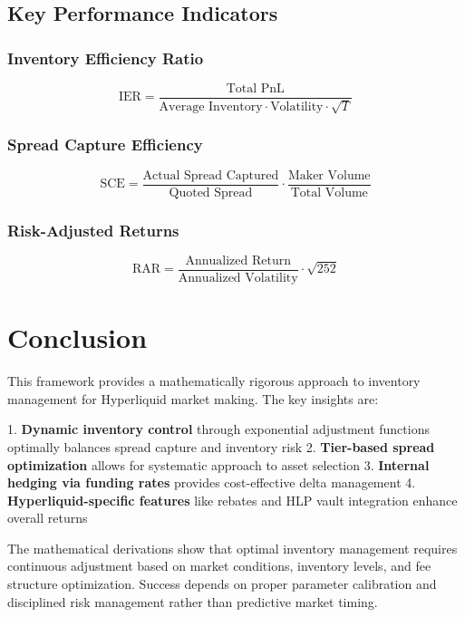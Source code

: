 \documentclass[11pt,a4paper]{article}
\theoremstyle{definition}
\begin{document}
\subsection{Key Performance Indicators}

\subsubsection{Inventory Efficiency Ratio}
\begin{equation}
\text{IER} = \frac{\text{Total PnL}}{\text{Average Inventory} \cdot \text{Volatility} \cdot \sqrt{T}}
\end{equation}

\subsubsection{Spread Capture Efficiency}
\begin{equation}
\text{SCE} = \frac{\text{Actual Spread Captured}}{\text{Quoted Spread}} \cdot \frac{\text{Maker Volume}}{\text{Total Volume}}
\end{equation}

\subsubsection{Risk-Adjusted Returns}
\begin{equation}
\text{RAR} = \frac{\text{Annualized Return}}{\text{Annualized Volatility}} \cdot \sqrt{252}
\end{equation}

\section{Conclusion}

This framework provides a mathematically rigorous approach to inventory management for Hyperliquid market making. The key insights are:

1. \textbf{Dynamic inventory control} through exponential adjustment functions optimally balances spread capture and inventory risk
2. \textbf{Tier-based spread optimization} allows for systematic approach to asset selection
3. \textbf{Internal hedging via funding rates} provides cost-effective delta management
4. \textbf{Hyperliquid-specific features} like rebates and HLP vault integration enhance overall returns

The mathematical derivations show that optimal inventory management requires continuous adjustment based on market conditions, inventory levels, and fee structure optimization. Success depends on proper parameter calibration and disciplined risk management rather than predictive market timing.
\end{document}

